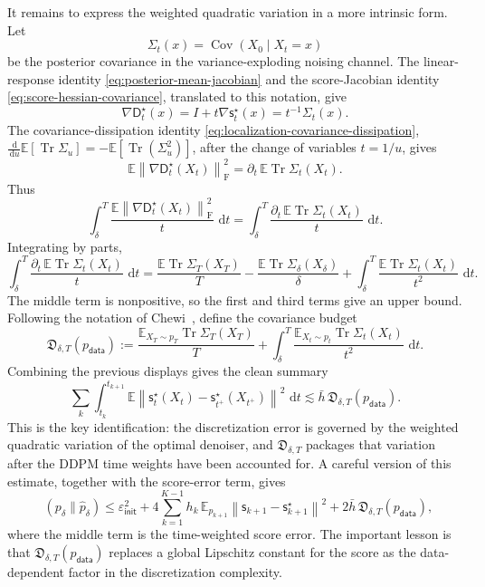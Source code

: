 \documentclass{amsart}
\numberwithin{equation}{section}
\theoremstyle{plain}
\theoremstyle{definition}
\theoremstyle{remark}
\DeclareMathOperator{\KL}{D_{\mathsf{KL}}}
\DeclareMathOperator{\Cov}{Cov}
\DeclareMathOperator{\Tr}{Tr}
\newcommand{\E}{\mathbb{E}}
\newcommand{\dd}{\,\mathrm{d}}
\newcommand{\Id}{I}
\newcommand{\wh}[1]{\widehat{#1}}
\newcommand{\norm}[1]{\left\lVert #1 \right\rVert}
\newcommand{\pdata}{p_{\mathsf{data}}}
\newcommand{\sstar}{\mathsf{s}^{\star}}
\newcommand{\score}{\mathsf{s}}
\newcommand{\dstar}{\mathsf{D}^{\star}}
\newcommand{\epsinit}{\varepsilon_{\mathsf{init}}}
\begin{document}
It remains to express the weighted quadratic variation in a more intrinsic
form.  Let
\[
    \Sigma_t(x)=\Cov(X_0\mid X_t=x)
\]
be the posterior covariance in the variance-exploding noising channel.  The
linear-response identity \eqref{eq:posterior-mean-jacobian} and the
score-Jacobian identity \eqref{eq:score-hessian-covariance}, translated to this
notation, give
\[
    \nabla \dstar_t(x)
    =
    \Id+t\nabla\sstar_t(x)
    =
    t^{-1}\Sigma_t(x).
\]
The covariance-dissipation identity
\eqref{eq:localization-covariance-dissipation},
$\frac{\dd}{\dd u}\E[\Tr\Sigma_u] = -\E[\Tr(\Sigma_u^2)]$, after the change of
variables $t=1/u$, gives
\[
    \E\norm{\nabla \dstar_t(X_t)}_{\mathrm F}^2
    =
    \partial_t\,\E\Tr\Sigma_t(X_t).
\]
Thus
\[
    \int_\delta^T
    \frac{\E\norm{\nabla \dstar_t(X_t)}_{\mathrm F}^2}{t}
    \,\dd t
    =
    \int_\delta^T
    \frac{\partial_t\,\E\Tr\Sigma_t(X_t)}{t}\,\dd t.
\]
Integrating by parts,
\[
    \int_\delta^T
    \frac{\partial_t\,\E\Tr\Sigma_t(X_t)}{t}\,\dd t
    =
    \frac{\E\Tr\Sigma_T(X_T)}{T}
    -
    \frac{\E\Tr\Sigma_\delta(X_\delta)}{\delta}
    +
    \int_\delta^T
    \frac{\E\Tr\Sigma_t(X_t)}{t^2}\,\dd t.
\]
The middle term is nonpositive, so the first and third terms give an upper
bound.  Following the notation of
Chewi~\cite[Chapter~12]{chewi2024logconcave}, define the covariance budget
\begin{equation}\label{eq:D-delta-T}
    \mathfrak D_{\delta,T}(\pdata)
    :=
    \frac{\E_{X_T\sim p_T}\Tr\Sigma_T(X_T)}{T}
    +
    \int_\delta^T
    \frac{\E_{X_t\sim p_t}\Tr\Sigma_t(X_t)}{t^2}\,\dd t.
\end{equation}
Combining the previous displays gives the clean summary
\[
    \sum_k
    \int_{t_k}^{t_{k+1}}
    \E\norm{
        \sstar_t(X_t)-\sstar_{t^+}(X_{t^+})
    }^2\,\dd t
    \lesssim
    \bar h\,\mathfrak D_{\delta,T}(\pdata).
\]
This is the key identification: the discretization error is governed by the
weighted quadratic variation of the optimal denoiser, and
$\mathfrak D_{\delta,T}$ packages that variation after the DDPM time weights
have been accounted for.  A careful version of this estimate, together with the
score-error term, gives
\begin{equation}\label{eq:chewi-ddpm-D}
    \KL(p_\delta\|\wh p_\delta)
    \leq
    \epsinit^2
    +
    4\sum_{k=1}^{K-1} h_k\,
    \E_{p_{k+1}}
    \norm{\score_{k+1}-\sstar_{k+1}}^2
    +
    2\bar h\,\mathfrak D_{\delta,T}(\pdata),
\end{equation}
where the middle term is the time-weighted score error.
The important lesson is that $\mathfrak D_{\delta,T}(\pdata)$ replaces a global
Lipschitz constant for the score as the data-dependent factor in the
discretization complexity.
\end{document}
